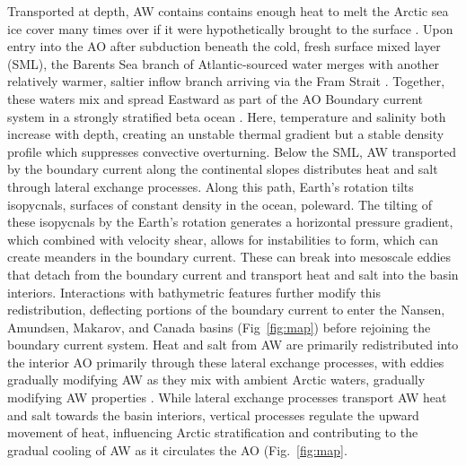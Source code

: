 \documentclass[draft]{agujournal2019}
\begin{document}
Transported at depth, AW contains contains enough heat to melt the Arctic sea ice cover many times over if it were hypothetically brought to the surface \cite{Polyakov2017,Stroeve2018,Grabon2021}. Upon entry into the AO after subduction beneath the cold, fresh surface mixed layer (SML), the Barents Sea branch of Atlantic-sourced water merges with another relatively warmer, saltier inflow branch arriving via the Fram Strait \cite{schauer1997,Lien_Trofimov_2013}. Together, these waters mix and spread Eastward as part of the AO Boundary current system in a strongly stratified beta ocean \cite{schauer1997,Wang2020,Rudels2022}. Here, temperature and salinity both increase with depth, creating an unstable thermal gradient but a stable density profile which suppresses convective overturning. Below the SML, AW transported by the boundary current along the continental slopes distributes heat and salt through lateral exchange processes. Along this path, Earth's rotation tilts isopycnals, surfaces of constant density in the ocean, poleward. The tilting of these isopycnals by the Earth's rotation generates a horizontal pressure gradient, which combined with velocity shear, allows for instabilities to form, which can create meanders in the boundary current. These can break into mesoscale eddies that detach from the boundary current and transport heat and salt into the basin interiors. Interactions with bathymetric features further modify this redistribution, deflecting portions of the boundary current to enter the Nansen, Amundsen, Makarov, and Canada basins (Fig~\ref{fig:map}) before rejoining the boundary current system. Heat and salt from AW are primarily redistributed into the interior AO primarily through these lateral exchange processes, with eddies gradually modifying AW as they mix with ambient Arctic waters, gradually modifying AW properties \cite{Rudels2008,Rudels2022}. While lateral exchange processes transport AW heat and salt towards the basin interiors, vertical processes regulate the upward movement of heat, influencing Arctic stratification and contributing to the gradual cooling of AW as it circulates the AO (Fig.~\ref{fig:map}.
\end{document}
